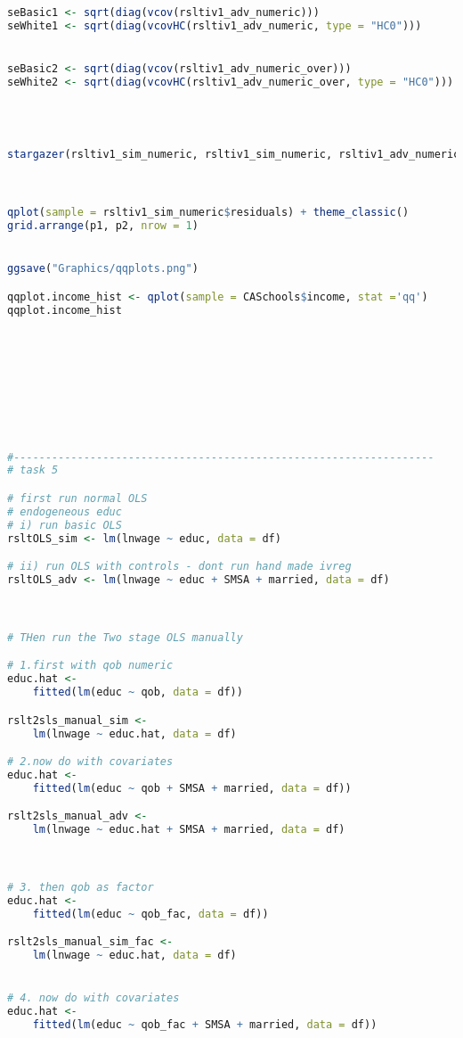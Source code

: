\documentclass[a4paper]{article}
\begin{document}
\begin{lstlisting}[language=R]
seBasic1 <- sqrt(diag(vcov(rsltiv1_adv_numeric)))
seWhite1 <- sqrt(diag(vcovHC(rsltiv1_adv_numeric, type = "HC0")))


seBasic2 <- sqrt(diag(vcov(rsltiv1_adv_numeric_over)))
seWhite2 <- sqrt(diag(vcovHC(rsltiv1_adv_numeric_over, type = "HC0")))




stargazer(rsltiv1_sim_numeric, rsltiv1_sim_numeric, rsltiv1_adv_numeric, rsltiv1_adv_numeric, rsltiv1_adv_numeric_over, rsltiv1_adv_numeric_over, se = list(seBasic, seWhite, seBasic1, seWhite1, seBasic2, seWhite2), type = "latex")



qplot(sample = rsltiv1_sim_numeric$residuals) + theme_classic()
grid.arrange(p1, p2, nrow = 1)


ggsave("Graphics/qqplots.png")

qqplot.income_hist <- qplot(sample = CASchools$income, stat ='qq')
qqplot.income_hist









#------------------------------------------------------------------
# task 5

# first run normal OLS
# endogeneous educ
# i) run basic OLS
rsltOLS_sim <- lm(lnwage ~ educ, data = df)

# ii) run OLS with controls - dont run hand made ivreg
rsltOLS_adv <- lm(lnwage ~ educ + SMSA + married, data = df)



# THen run the Two stage OLS manually

# 1.first with qob numeric
educ.hat <-
    fitted(lm(educ ~ qob, data = df))

rslt2sls_manual_sim <-
    lm(lnwage ~ educ.hat, data = df)

# 2.now do with covariates
educ.hat <-
    fitted(lm(educ ~ qob + SMSA + married, data = df))

rslt2sls_manual_adv <-
    lm(lnwage ~ educ.hat + SMSA + married, data = df)



# 3. then qob as factor
educ.hat <-
    fitted(lm(educ ~ qob_fac, data = df))

rslt2sls_manual_sim_fac <-
    lm(lnwage ~ educ.hat, data = df)


# 4. now do with covariates
educ.hat <-
    fitted(lm(educ ~ qob_fac + SMSA + married, data = df))


\end{lstlisting}
\end{document}
